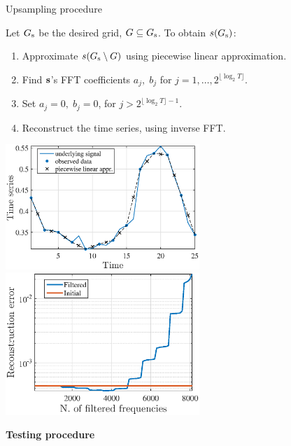 \documentclass{beamer}
\begin{document}
\begin{frame}{Upsampling procedure}

Let $G_{\text{s}}$ be the desired grid, $G \subseteq G_{\text{s}}$. To obtain $s(G_{\text{s}})$:
\begin{enumerate}
\item Approximate $s(G_{\text{s}}\setminus G)$ using piecewise linear approximation.
\item Find ${\mathbf{s}}$'s FFT coefficients $a_j,\; b_j$ for  $j = 1, \dots, 2^{\lfloor\log_2T\rfloor}$.
\item Set $a_j = 0,\; b_j=0$, for  $j > 2^{{\lfloor\log_2T\rfloor} - 1}$.
\item Reconstruct the time series, using inverse FFT.

\end{enumerate}
\includegraphics[width=0.55\textwidth]{pw_linear_approximation.eps}
\includegraphics[width=0.55\textwidth]{fft_rec_err_upsampling.eps}

\end{frame}
\begin{frame}
\vfill
\begin{center}
{\Large \bf Testing procedure}
\end{center}
\vfill
\end{frame}
\end{document}
